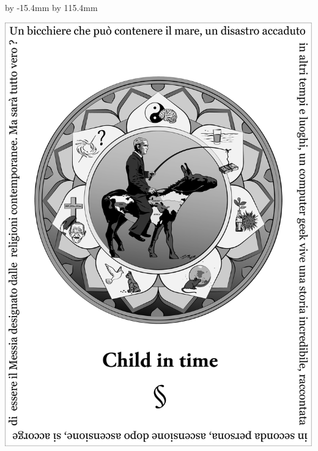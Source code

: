 \begin{titlepage}%
\begin{center}%
\newenvironment{changemargin}{%
\begin{list}{}{%
\setlength{\leftmargin}{-1in+1cm}%
\setlength{\rightmargin}{-1in+1cm}%
\setlength{\textwidth}{128mm}%
\setlength{\textheight}{190mm}%
}%
\item[]}{\end{list}}%
%
\advance\voffset by -15.4mm %
\advance\vsize by 115.4mm %
\begin{changemargin}%
\vspace*{\fill}%
\noindent\includegraphics[width=\textwidth]{copertina-ital.png}%
\vspace*{\fill}%
\end{changemargin}%


\end{center}
\end{titlepage}
